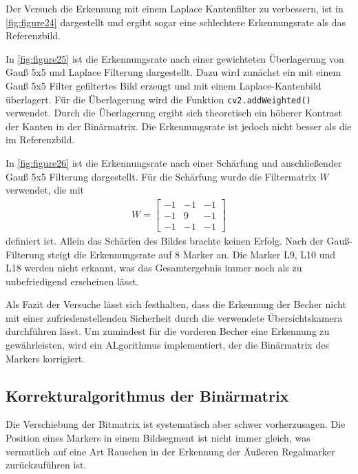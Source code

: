     Der Versuch die Erkennung mit einem Laplace Kantenfilter zu verbessern, ist in \ref{fig:figure24} dargestellt und ergibt sogar eine schlechtere Erkennungsrate als das Referenzbild.
    
    In \ref{fig:figure25} ist die Erkennungsrate nach einer gewichteten Überlagerung von Gauß 5x5 und Laplace Filterung dargestellt. 
    Dazu wird zunächst ein mit einem Gauß 5x5 Filter gefiltertes Bild erzeugt und mit einem Laplace-Kantenbild überlagert. 
    Für die Überlagerung wird die Funktion \verb|cv2.addWeighted()| verwendet. 
    Durch die Überlagerung ergibt sich theoretisch ein höherer Kontrast der Kanten in der Binärmatrix. 
    Die Erkennungsrate ist jedoch nicht besser als die im Referenzbild.

    In \ref{fig:figure26} ist die Erkennungsrate nach einer Schärfung und anschließender Gauß 5x5 Filterung dargestellt.
    Für die Schärfung wurde die Filtermatrix $W$ verwendet, die mit 
    \begin{align*}
        W = \begin{bmatrix}
            -1 & -1 & -1 \\
            -1 & 9 & -1 \\
            -1 & -1 & -1
        \end{bmatrix}
    \end{align*}
    definiert ist. Allein das Schärfen des Bildes brachte keinen Erfolg. Nach der Gauß-Filterung steigt die Erkennungsrate auf 8 Marker an. 
    Die Marker L9, L10 und L18 werden nicht erkannt, was das Gesamtergebnis immer noch als zu unbefriedigend erscheinen lässt.

    Als Fazit der Versuche lässt sich festhalten, dass die Erkennung der Becher nicht mit einer zufriedenstellenden Sicherheit durch die verwendete Übersichtskamera durchführen lässt.
    Um zumindest für die vorderen Becher eine Erkennung zu gewährleisten, wird ein ALgorithmus implementiert, der die Binärmatrix des Markers korrigiert.
    \clearpage

    \subsection{Korrekturalgorithmus der Binärmatrix}\label{ChapKorrekturalgorithmus}

    Die Verschiebung der Bitmatrix ist systematisch aber schwer vorherzusagen. Die Position eines Markers in einem Bildsegment ist nicht immer gleich, was vermutlich auf eine Art Rauschen in der Erkennung der 
    Äußeren Regalmarker zurückzuführen ist.

